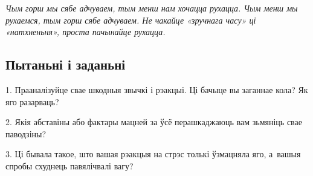 \emph{Чым горш мы сябе адчуваем, тым менш нам хочацца рухацца. Чым менш мы рухаемся, тым горш сябе адчуваем. Не чакайце «зручнага часу» ці «натхненьня», проста пачынайце рухацца.}

\subsection*{Пытаньні і заданьні}

1. Прааналізуйце свае шкодныя звычкі і рэакцыі. Ці бачыце вы заганнае кола? Як яго разарваць?

2. Якія абставіны або фактары мацней за ўсё перашкаджаюць вам зьмяніць свае паводзіны?

3. Ці бывала такое, што вашая рэакцыя на стрэс толькі ўзмацняла яго, а~вашыя спробы схуднець павялічвалі вагу?

